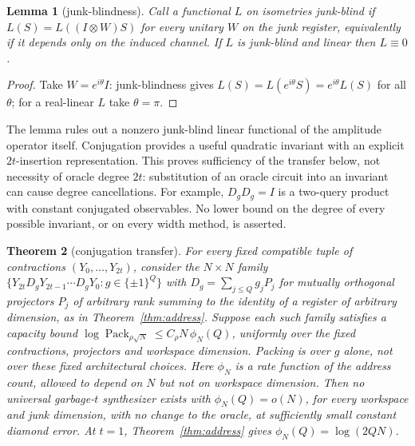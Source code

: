 \documentclass[11pt,a4paper]{article}
\theoremstyle{plain}
\newtheorem{theorem}{Theorem}[section]
\newtheorem{lemma}[theorem]{Lemma}
\theoremstyle{definition}
\theoremstyle{remark}
\DeclareMathOperator{\Pack}{Pack}
\begin{document}
\begin{lemma}[junk-blindness]\label{lem:junk}
Call a functional $L$ on isometries junk-blind if $L(S)=L((I\otimes W)S)$ for every unitary
$W$ on the junk register, equivalently if it depends only on the induced channel. If $L$ is
junk-blind and linear then $L\equiv0$.
\end{lemma}

\begin{proof}
Take $W=e^{i\theta}I$: junk-blindness gives $L(S)=L(e^{i\theta}S)=e^{i\theta}L(S)$ for all
$\theta$; for a real-linear $L$ take $\theta=\pi$.
\end{proof}

The lemma rules out a nonzero junk-blind linear functional of the amplitude operator itself.
Conjugation provides a useful quadratic invariant with an explicit $2t$-insertion
representation. This proves sufficiency of the transfer below, not necessity of
oracle degree $2t$: substitution of an oracle circuit into an invariant can cause
degree cancellations. For example, $D_gD_g=I$ is a two-query product with constant
conjugated observables. No lower bound on the degree of every possible invariant,
or on every width method, is asserted.

\begin{theorem}[conjugation transfer]\label{thm:transfer}
For every fixed compatible tuple of contractions $(Y_0,\ldots,Y_{2t})$, consider the
$N\times N$ family $\{Y_{2t}D_gY_{2t-1}\cdots D_gY_0:g\in\{\pm1\}^Q\}$ with
$D_g=\sum_{j\le Q}g_jP_j$ for mutually orthogonal projectors $P_j$ of arbitrary rank summing
to the identity of a register of arbitrary dimension, as in Theorem~\ref{thm:address}.
Suppose each such family satisfies a capacity bound
$\log\Pack_{\rho\sqrt N}\le C_\rho N\,\phi_N(Q)$, uniformly over the fixed contractions,
projectors and workspace dimension. Packing is over $g$ alone, not over these fixed
architectural choices. Here $\phi_N$ is a rate function of the address count, allowed to
depend on $N$ but not on workspace dimension.
Then no universal garbage-$t$ synthesizer exists with
$\phi_N(Q)=o(N)$, for every workspace and junk dimension, with no change to the oracle, at
sufficiently small constant diamond error. At $t=1$, Theorem~\ref{thm:address} gives $\phi_N(Q)=\log(2QN)$.
\end{theorem}
\end{document}
